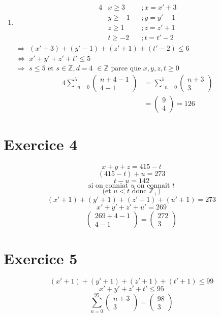 \documentclass[fontsize=10pt]{article}
\begin{document}
\begin{enumerate}
\item
\begin{alignat*}{4}
 &x \geq 3 &&; x =x' +3\\
&y \geq -1 &&; y = y' -1\\
&z \geq 1 &&; z = z' +1\\
&t \geq -2 &&; t = t'-2
\end{alignat*}
$\Rightarrow$ $(x'+3)+(y'-1)+(z'+1)+(t'-2) \leq 6$\\
$\Leftrightarrow$ $x'+y'+z'+t' \leq 5$ \\
$\Rightarrow$ $s \leq 5 \text{ et } s \in \mathbb{Z}, d=4$ \hspace{3cm} $\in \mathbb{Z}$ parce que $x,y,z,t\geq 0$\\
\begin{alignat*}{4}
\underset{n=0}{\overset{5}{\sum}}
\begin{pmatrix}
n + 4 -1\\
4-1
\end{pmatrix}
&= \underset{n=0}{\overset{5}{\sum}}
\begin{pmatrix}
n+3\\
3
\end{pmatrix}\\
&= 
\begin{pmatrix}
9\\
4
\end{pmatrix} = 126
\end{alignat*}
\end{enumerate}
\section*{Exercice 4}
$$x+y+z = 415 -t$$
$$(415-t)+u = 273$$
$$t-u = 142$$
$$\text{si on conniat $u$ on connait $t$}$$
$$\text{(et $u < t$ donc $\mathbb{Z}_+$)}$$
$$ (x'+1)+(y'+1)+(z'+1)+(u'+1)=273$$
$$ x'+y'+z'+u' = 269$$
$$\begin{pmatrix}
269+4-1\\
4-1
\end{pmatrix} = 
\begin{pmatrix}
272\\
3
\end{pmatrix}
$$
\section*{Exercice 5}
$$ (x'+1)+(y'+1)+(z'+1)+(t'+1) \leq 99$$
$$ x'+y'+z'+t' \leq 95$$
$$ \underset{n=0}{\overset{95}{\sum}}
\begin{pmatrix}
n+3\\
3
\end{pmatrix} = \begin{pmatrix}
98\\
3
\end{pmatrix}$$
\end{document}
